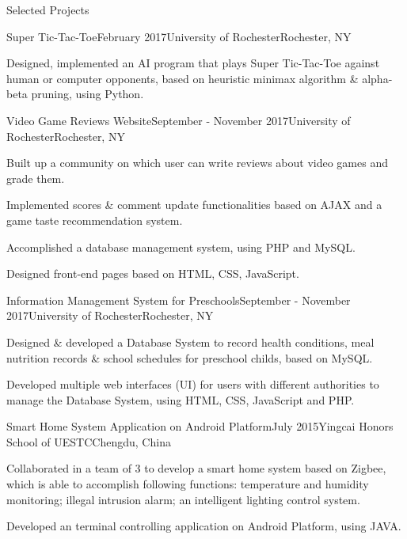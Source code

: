 \documentclass{resume} %
\begin{document}
\begin{rSection}{Selected Projects}
	
	\begin{rSubsection}{Super Tic-Tac-Toe}{February 2017}{University of Rochester}{Rochester, NY}
		\item Designed, implemented an AI program that plays Super Tic-Tac-Toe against human or computer opponents, based on heuristic minimax algorithm \& alpha-beta pruning, using Python.
	\end{rSubsection}
	
	\begin{rSubsection}{Video Game Reviews Website}{September - November 2017}{University of Rochester}{Rochester, NY}
		\item Built up a community on which user can write reviews about video games and grade them.
		\item Implemented scores \& comment update functionalities based on AJAX and a game taste recommendation system.
		\item Accomplished a database management system, using PHP and MySQL.
		\item Designed front-end pages based on HTML, CSS, JavaScript.
	\end{rSubsection}
	
	\begin{rSubsection}{Information Management System for Preschools}{September - November 2017}{University of Rochester}{Rochester, NY}
		\item Designed \& developed a Database System to record health conditions, meal nutrition records \& school schedules for preschool childs, based on MySQL.
		\item Developed multiple web interfaces (UI) for users with different authorities to manage the Database System, using HTML, CSS, JavaScript and PHP. 
	\end{rSubsection}
	
	\begin{rSubsection}{Smart Home System Application on Android Platform}{July 2015}{Yingcai Honors School of UESTC}{Chengdu, China}
		\item Collaborated in a team of 3 to develop a smart home system based on Zigbee, which is able to accomplish following
		functions: temperature and humidity monitoring; illegal intrusion alarm; an intelligent lighting control system.
		\item Developed an terminal controlling application on Android Platform, using JAVA.
	\end{rSubsection}
	
\end{rSection}
\end{document}
